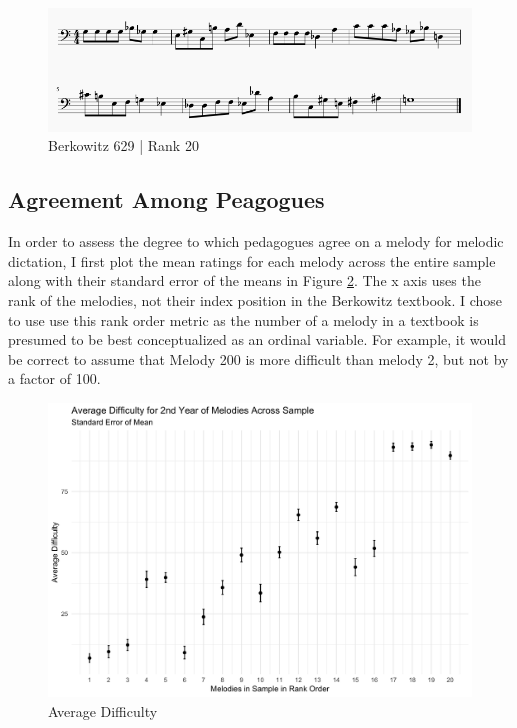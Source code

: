 \documentclass[]{book}
\begin{document}
\begin{figure}

{\centering \includegraphics[width=1\linewidth]{img/survey_melodies/Berkowitz629} 

}

\caption{Berkowitz 629 | Rank 20}\label{fig:berk629}
\end{figure}

\hypertarget{agreement-among-peagogues}{%
\subsection{Agreement Among Peagogues}\label{agreement-among-peagogues}}

In order to assess the degree to which pedagogues agree on a melody for melodic dictation, I first plot the mean ratings for each melody across the entire sample along with their standard error of the means in Figure \ref{fig:diffplot}.
The x axis uses the rank of the melodies, not their index position in the Berkowitz textbook.
I chose to use use this rank order metric as the number of a melody in a textbook is presumed to be best conceptualized as an ordinal variable.
For example, it would be correct to assume that Melody 200 is more difficult than melody 2, but not by a factor of 100.

\begin{figure}

{\centering \includegraphics[width=1\linewidth]{img/difficulty_plot} 

}

\caption{Average Difficulty}\label{fig:diffplot}
\end{figure}
\end{document}

